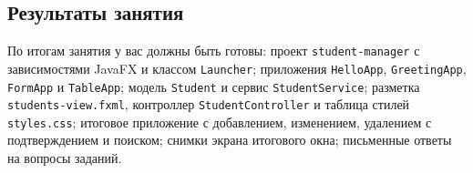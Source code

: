 \subsection*{Результаты занятия}

По итогам занятия у вас должны быть готовы: проект \texttt{student-manager} с
зависимостями JavaFX и классом \texttt{Launcher}; приложения \texttt{HelloApp},
\texttt{GreetingApp}, \texttt{FormApp} и \texttt{TableApp}; модель
\texttt{Student} и сервис \texttt{StudentService}; разметка
\texttt{students-view.fxml}, контроллер \texttt{StudentController} и таблица
стилей \texttt{styles.css}; итоговое приложение с добавлением, изменением,
удалением с подтверждением и поиском; снимки экрана итогового окна; письменные
ответы на вопросы заданий.

\kontrolvoprosy

